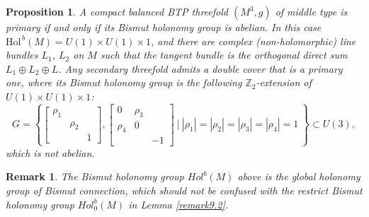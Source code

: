 \documentclass{amsart}
\numberwithin{equation}{section}
\newtheorem{proposition}[theorem]{Proposition}
\newtheorem{remark}  [theorem]     {Remark}
\theoremstyle{definition}
\renewcommand{\1}{\mathds{1}}
\renewcommand{\>}{\rightarrow}
\begin{document}
\begin{proposition} \label{propsecondary}
A compact balanced BTP threefold $(M^3,g)$ of middle type is primary if and only if its Bismut holonomy group is abelian. In this case $\mbox{Hol}^{\, b}(M)= U(1)\!\times\!U(1)\!\times\!1$, and there are complex (non-holomorphic) line bundles $L_1$, $L_2$ on $M$ such that the tangent bundle is the orthogonal direct sum $L_1\oplus L_2\oplus L$. Any secondary threefold admits a double cover that is a primary one, where its Bismut holonomy group is the following ${\mathbb Z}_2$-extension of $U(1)\!\times\!U(1)\!\times\!1$:
$$ G= \left\{ \begin{bmatrix} \rho_1 & & \\ & \rho_2 & \\ && 1\end{bmatrix},
\begin{bmatrix} 0 & \rho_3  & \\  \rho_4 &0 & \\ && -1\end{bmatrix} \ \Bigg| \ |\rho_1|=|\rho_2|=|\rho_3|=|\rho_4|=1\ \right\} \subset U(3),$$
which is not abelian.
\end{proposition}

\begin{remark}
The Bismut holonomy group $Hol^b(M)$ above is the global holonomy group of Bismut connection, which should not be confused with
the restrict Bismut holonomy group $Hol_0^b(M)$ in Lemma \ref{remark9.2}. %
\end{remark}
\end{document}
